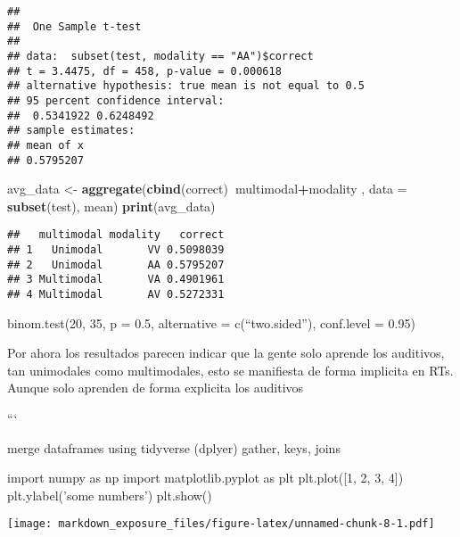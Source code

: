 \documentclass[]{article}
\newenvironment{Shaded}{\begin{snugshade}}{\end{snugshade}}
\newcommand{\DataTypeTok}[1]{\textcolor[rgb]{0.13,0.29,0.53}{#1}}
\newcommand{\DecValTok}[1]{\textcolor[rgb]{0.00,0.00,0.81}{#1}}
\newcommand{\FloatTok}[1]{\textcolor[rgb]{0.00,0.00,0.81}{#1}}
\newcommand{\ImportTok}[1]{#1}
\newcommand{\KeywordTok}[1]{\textcolor[rgb]{0.13,0.29,0.53}{\textbf{#1}}}
\newcommand{\NormalTok}[1]{#1}
\newcommand{\OperatorTok}[1]{\textcolor[rgb]{0.81,0.36,0.00}{\textbf{#1}}}
\newcommand{\StringTok}[1]{\textcolor[rgb]{0.31,0.60,0.02}{#1}}
\begin{document}
\begin{Shaded}
\end{Shaded}

\begin{verbatim}
## 
##  One Sample t-test
## 
## data:  subset(test, modality == "AA")$correct
## t = 3.4475, df = 458, p-value = 0.000618
## alternative hypothesis: true mean is not equal to 0.5
## 95 percent confidence interval:
##  0.5341922 0.6248492
## sample estimates:
## mean of x 
## 0.5795207
\end{verbatim}

\begin{Shaded}
\begin{Highlighting}[]
\NormalTok{avg_data <-}\StringTok{ }\KeywordTok{aggregate}\NormalTok{(}\KeywordTok{cbind}\NormalTok{(correct)}\OperatorTok{~}\NormalTok{multimodal}\OperatorTok{+}\NormalTok{modality , }\DataTypeTok{data =} \KeywordTok{subset}\NormalTok{(test), mean)}
\KeywordTok{print}\NormalTok{(avg_data)}
\end{Highlighting}
\end{Shaded}

\begin{verbatim}
##   multimodal modality   correct
## 1   Unimodal       VV 0.5098039
## 2   Unimodal       AA 0.5795207
## 3 Multimodal       VA 0.4901961
## 4 Multimodal       AV 0.5272331
\end{verbatim}

binom.test(20, 35, p = 0.5, alternative = c(``two.sided''), conf.level =
0.95)

Por ahora los resultados parecen indicar que la gente solo aprende los
auditivos, tan unimodales como multimodales, esto se manifiesta de forma
implicita en RTs. Aunque solo aprenden de forma explicita los auditivos

```

merge dataframes using tidyverse (dplyer) gather, keys, joins

\begin{Shaded}
\begin{Highlighting}[]
\ImportTok{import}\NormalTok{ numpy }\ImportTok{as}\NormalTok{ np}
\ImportTok{import}\NormalTok{ matplotlib.pyplot }\ImportTok{as}\NormalTok{ plt}
\NormalTok{plt.plot([}\DecValTok{1}\NormalTok{, }\DecValTok{2}\NormalTok{, }\DecValTok{3}\NormalTok{, }\DecValTok{4}\NormalTok{])}
\NormalTok{plt.ylabel(}\StringTok{'some numbers'}\NormalTok{)}
\NormalTok{plt.show()}
\end{Highlighting}
\end{Shaded}

\texttt{[image: markdown\_exposure\_files/figure-latex/unnamed-chunk-8-1.pdf]}
\end{document}
